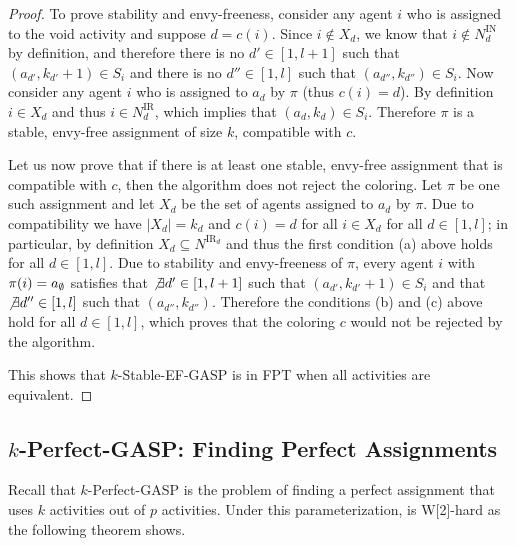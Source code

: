 \begin{proof}
	To prove stability and envy-freeness, consider any agent $i$ who is assigned to the void activity and suppose $d = c(i)$. Since $i\not\in X_d$, we know that $i\not\in N^{\text{IN}}_d$ by definition, and therefore there is no $d'\in[1,l+1]$ such that $(a_{d'}, k_{d'}+1)\in S_i$ and there is no $d'' \in[1,l]$ such that $(a_{d''}, k_{d''}) \in S_i$. 
	Now consider any agent $i$ who is assigned to $a_d$ by $\pi$ (thus $c(i) = d$). By definition $i\in X_d$ and thus $i\in N^{\text{IR}}_d$, which implies that $(a_d, k_d)\in S_i$. Therefore $\pi$ is a stable, envy-free assignment of size $k$, compatible with $c$. 

	Let us now prove that if there is at least one stable, envy-free assignment that is compatible with $c$, then the algorithm does not reject the coloring. 
	Let $\pi$ be one such assignment and let $X_d$ be the set of agents assigned to $a_d$ by $\pi$. Due to compatibility we have $|X_d| = k_d$ and $c(i) = d$ for all $i \in X_d$ for all $d\in [1, l]$; in particular, by definition $X_d \subseteq N^{\text{IR}_d}$ and thus the first condition (a) above holds for all $d\in [1, l]$. Due to stability and envy-freeness of $\pi$, every agent $i$ with $\pi(i) = a_{\emptyset}$ satisfies that $\not\exists d'\in [1, l+1]$ such that $(a_{d'}, k_{d'}+1) \in S_i$ and that $\not\exists d''\in[1,l]$ such that $(a_{d''}, k_{d''})$. Therefore the conditions (b) and (c) above hold for all $d\in [1, l]$, which proves that the coloring $c$ would not be rejected by the algorithm.

	This shows that $k$-Stable-EF-GASP is in FPT when all activities are equivalent.
\end{proof}

\subsection{$k$-Perfect-GASP: Finding Perfect Assignments}
Recall that $k$-Perfect-GASP is the problem of finding a perfect assignment that uses $k$ activities out of $p$ activities. 
Under this parameterization, \GASPs is W[2]-hard as the following theorem shows. 

